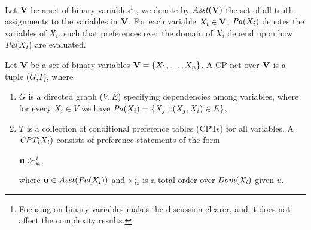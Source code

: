 Let $\textbf{V}$ be a set of binary variables\footnote{
	Focusing on binary variables makes the discussion clearer,
	and it does not affect the complexity results.
}
, we denote by $\mathit{Asst}(\textbf{V})$ the set of
all truth assignments to the variables in $\textbf{V}$.
For each variable $X_i \in \textbf{V}$, $\mathit{Pa}(X_i)$ denotes the  variables of
$X_i$, such that preferences over the domain of $X_i$ depend upon how
$\mathit{Pa}(X_i)$ are evaluated.
%
%

\begin{definition}
\label{def:cpn}
	Let $\textbf{V}$ be a set of binary variables $\textbf{V}=\{X_1,\ldots,X_n\}$.
	A CP-net over $\textbf{V}$ is a tuple ($G$,$T$), where
	\begin{enumerate} \itemsep -4pt
		\item $G$ is a directed graph ($V,E$) specifying
					dependencies among variables,
					where for every $X_i \in V$ we have
					$\mathit{Pa}(X_i)=\{X_j:(X_j,X_i) \in E\}$,
		\item $T$ is a collection of 
					conditional preference tables (CPTs) for
					all variables.  A $\textit{CPT}(X_i)$ consists of preference
					statements of the form
					\begin{center}
						$\textbf{u} : \succ^i_{\textbf{u}}$,
					\end{center}
					where $\textbf{u} \in \mathit{Asst}(\mathit{Pa}(X_i))$ and $\succ^i_{\textbf{u}}$
					is a total order over $\it{Dom}(X_i)$ given $u$.
	\end{enumerate}
\end{definition}

